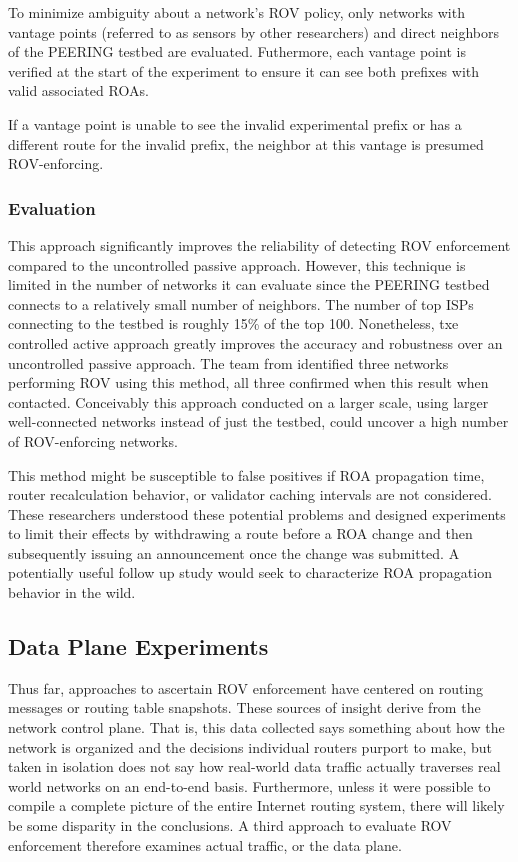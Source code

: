 \documentclass[sigconf]{acmart}
\begin{document}
To minimize ambiguity about a network's ROV policy, only networks with
vantage points (referred to as sensors by other researchers) and direct
neighbors of the PEERING testbed are evaluated.  Futhermore, each
vantage point is verified at the start of the experiment to ensure it
can see both prefixes with valid associated ROAs.

If a vantage point is unable to see the invalid experimental prefix or
has a different route for the invalid prefix, the neighbor at this
vantage is presumed ROV-enforcing.

\subsubsection{Evaluation}

This approach significantly improves the reliability of detecting ROV
enforcement compared to the uncontrolled passive approach.  However,
this technique is limited in the number of networks it can evaluate
since the PEERING testbed connects to a relatively small number of
neighbors. The number of top ISPs connecting to the testbed is roughly
15\% of the top 100.  Nonetheless, txe controlled active approach
greatly improves the accuracy and robustness over an uncontrolled
passive approach.  The team from \cite{reuter_towards_2018} identified
three networks performing ROV using this method, all three confirmed
when this result when contacted.  Conceivably this approach conducted on
a larger scale, using larger well-connected networks instead of just the
testbed, could uncover a high number of ROV-enforcing networks.

This method might be susceptible to false positives if ROA propagation
time, router recalculation behavior, or validator caching intervals are
not considered.  These researchers understood these potential problems
and designed experiments to limit their effects by withdrawing a route
before a ROA change and then subsequently issuing an announcement once
the change was submitted.  A potentially useful follow up study would
seek to characterize ROA propagation behavior in the wild.

\subsection{Data Plane Experiments}

Thus far, approaches to ascertain ROV enforcement have centered on
routing messages or routing table snapshots.  These sources of insight
derive from the network control plane.  That is, this data collected
says something about how the network is organized and the decisions
individual routers purport to make, but taken in isolation does not say
how real-world  data traffic actually traverses real world networks on
an end-to-end basis.  Furthermore, unless it were possible to compile a
complete picture of the entire Internet routing system, there will
likely be some disparity in the conclusions.  A third approach to
evaluate ROV enforcement therefore examines actual traffic, or the data
plane.
\end{document}

